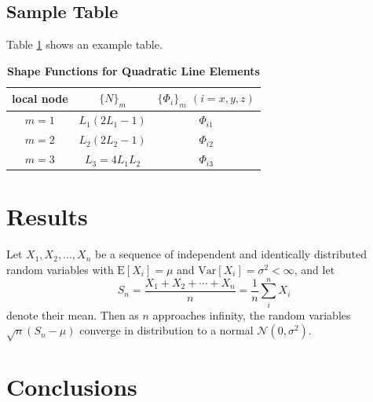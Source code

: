 \documentclass[9pt,twocolumn,twoside]{optica}
\begin{document}
\subsection{Sample Table}

Table \ref{tab:shape-functions} shows an example table.

\begin{table}[htbp]
\centering
\caption{\bf Shape Functions for Quadratic Line Elements}
\begin{tabular}{ccc}
\hline
local node & $\{N\}_m$ & $\{\Phi_i\}_m$ $(i=x,y,z)$ \\
\hline
$m = 1$ & $L_1(2L_1-1)$ & $\Phi_{i1}$ \\
$m = 2$ & $L_2(2L_2-1)$ & $\Phi_{i2}$ \\
$m = 3$ & $L_3=4L_1L_2$ & $\Phi_{i3}$ \\
\hline
\end{tabular}
  \label{tab:shape-functions}
\end{table}

\section{Results}

Let $X_1, X_2, \ldots, X_n$ be a sequence of independent and identically distributed random variables with $\text{E}[X_i] = \mu$ and $\text{Var}[X_i] = \sigma^2 < \infty$, and let
\begin{equation}
S_n = \frac{X_1 + X_2 + \cdots + X_n}{n}
      = \frac{1}{n}\sum_{i}^{n} X_i
\label{eq:refname1}
\end{equation}
denote their mean. Then as $n$ approaches infinity, the random variables $\sqrt{n}(S_n - \mu)$ converge in distribution to a normal $\mathcal{N}(0, \sigma^2)$.

\section{Conclusions}




\end{document}

